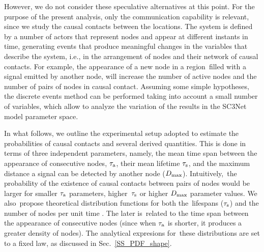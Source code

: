 \documentclass[crop]{CSLB}
\newcommand{\ceti}{node}
\newcommand{\cetis}{nodes}
\begin{document}
%
However, we do not consider these speculative alternatives at this point.
%
For the purpose of the present analysis, only the communication capability is
relevant, since we study the causal contacts between the locations.
%
The system is defined by a number of actors that represent \cetis{} and appear
at different instants in time, generating events that produce meaningful
changes in the variables that describe the system, i.e., in the arrangement of
\cetis{} and their network of causal contacts.
%
For example, the appearance of a new \ceti{} in a region filled with a signal
emitted by another node, will increase the number of active \cetis{} and the
number of pairs of \cetis{} in causal contact.
%
Assuming some simple hypotheses, the discrete events method can be performed
taking into account a small number of variables, which allow to analyze the
variation of the results in the SC3Net model parameter space.


In what follows, we outline the experimental setup adopted to estimate the
probabilities of causal contacts and several derived quantities.
%
This is done in terms of three independent parameters, namely, the mean time
span between the appearance of consecutive \cetis{}, $\tau_{\rm a}$,
their mean lifetime $\tau_{\rm s}$, and the maximum distance a signal
can be detected by another \ceti{} ($D_{\rm max}$).
%
Intuitively, the probability of the existence of causal contacts between pairs
of \cetis{} would be larger for smaller $\tau_{\rm a}$ parameters,
higher $\tau_{\rm s}$ or
higher $D_{\rm max}$ parameter values.
%
We also propose theoretical distribution functions for both the lifespans
($\tau_{\rm s}$) and the number of \cetis{} per unit time
\citep{maccone_evolution_2014, Sotos_biotechnology_2019}.
%
The later is related to the time span between the appearance of consecutive
\cetis{} (since when $\tau_{\rm a}$ is shorter, it produces a greater
density of \cetis{}).
%
The analytical expresions for these distributions are set to a fixed law, as
discussed in Sec.~\ref{SS_PDF_shape}.  
    
     
\end{document}
